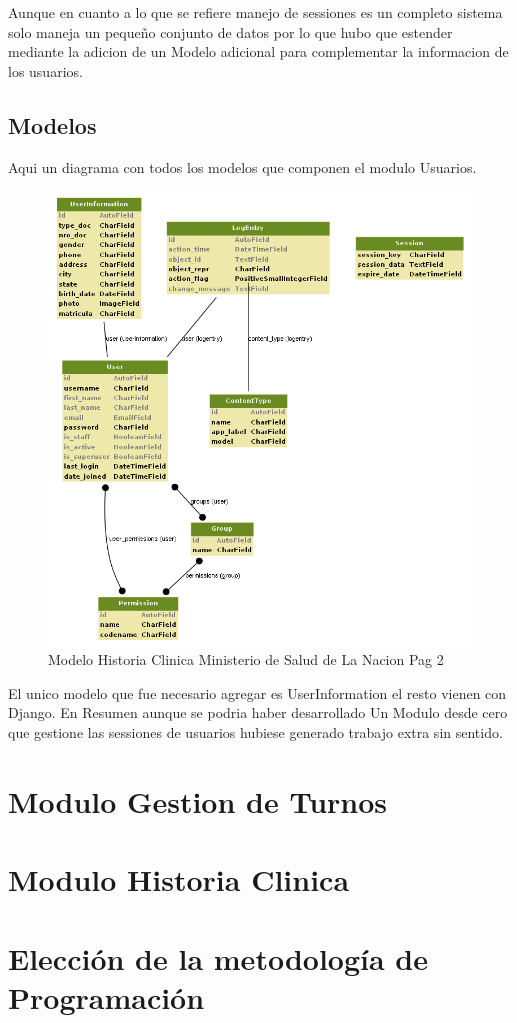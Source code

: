 Aunque en cuanto a lo que se refiere manejo de sessiones es un completo sistema
solo maneja un peque\~no conjunto de datos por lo que hubo que estender mediante 
la adicion de un Modelo adicional para complementar la informacion de los 
usuarios.

\subsection{Modelos}

Aqui un diagrama con todos los modelos que componen el modulo Usuarios.

\begin{figure}[H]
    \centering
    \includegraphics[scale=0.7]{resourse/auth.png}
    \caption{Modelo Historia Clinica Ministerio de Salud de La Nacion Pag 2}
    \label{fig:07}
\end{figure}

El unico modelo que fue necesario agregar es UserInformation el resto vienen
con Django. En Resumen aunque se podria haber desarrollado Un Modulo desde
 cero que gestione las sessiones de usuarios hubiese generado trabajo extra sin
 sentido.

\section{Modulo Gestion de Turnos}

\section{Modulo Historia Clinica}

\section{Elecci\'on de la metodolog\'ia de Programaci\'on}

